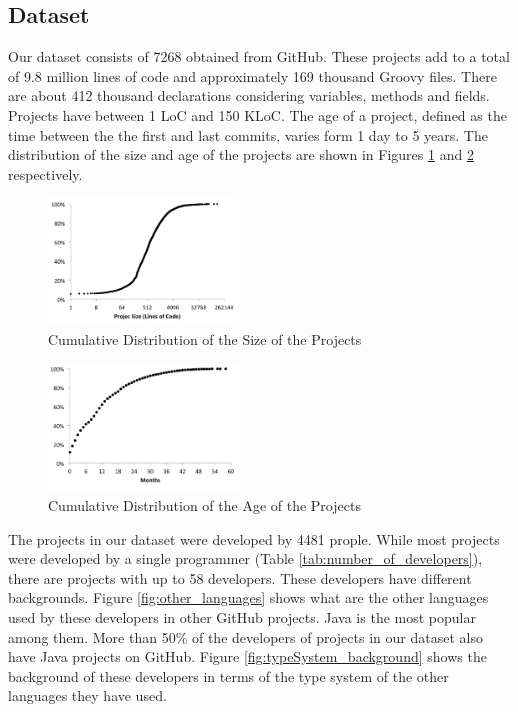 \documentclass[preprint]{sigplanconf}
\begin{document}
\subsection{Dataset\label{dataset}}
Our dataset consists of 7268 obtained from GitHub. 
These projects add to a total of 9.8 million lines of code and approximately 169 thousand Groovy files. 
There are about 412 thousand declarations considering variables, methods and fields. Projects have between 1 LoC and 150 KLoC. The age of a project, defined as the time between the the first and last commits, varies form 1 day to 5 years. The distribution of the size and age of the projects are shown in Figures \ref{fig:size_distribution} and \ref{fig:age_distribution} respectively. 

\begin{figure}[ht]
\centering \includegraphics[width=0.45\textwidth]{images/size_distribution}
\caption{Cumulative Distribution of the Size of the Projects}
\label{fig:size_distribution} 
\end{figure}

\begin{figure}[ht]
\centering \includegraphics[width=0.45\textwidth]{images/age_distribution}
\caption{Cumulative Distribution of the Age of the Projects}
\label{fig:age_distribution} 
\end{figure}

The projects in our dataset were developed by 4481 prople. 
While most projects were developed by a single programmer (Table \ref{tab:number_of_developers}), there are projects with up to 58 developers.
These developers have different backgrounds.
Figure \ref{fig:other_languages} shows what are the other languages used by these developers in other GitHub projects. 
Java is the most popular among them.
More than 50\% of the developers of projects in our dataset also have Java projects on GitHub.
Figure \ref{fig:typeSystem_background} shows the background of these developers in terms of the type system of the other languages they have used.
 
\end{document}
